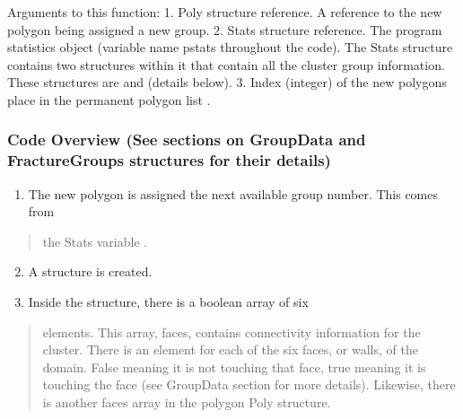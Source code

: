 \documentclass[letterpaper,10pt,english]{sphinxmanual}
\begin{document}
Arguments to this function:
1.      Poly structure reference. A reference to the new
polygon being assigned a new group.
2.      Stats structure reference. The program
statistics object (variable name pstats throughout the code). The Stats
structure contains two structures within it that contain all the cluster group
information. These structures are  and  (details
below).
3.      Index (integer) of the new polygons place in the permanent polygon
list .


\subsubsection{Code Overview (See sections on GroupData and FractureGroups structures for their details)}
\label{dfngen:code-overview-see-sections-on-groupdata-and-fracturegroups-structures-for-their-details}\begin{enumerate}
\item {} 
The new polygon is assigned the next available group number. This comes from

\end{enumerate}
\begin{quote}

the Stats variable .
\end{quote}
\begin{enumerate}
\setcounter{enumi}{1}
\item {} 
A  structure is created.

\item {} 
Inside the  structure, there is a boolean array of six

\end{enumerate}
\begin{quote}

elements. This array, faces, contains connectivity information for the
cluster. There is an element for each of the six faces, or walls, of the
domain. False meaning it is not touching that face, true meaning it is
touching the face (see GroupData section for more details). Likewise, there
is another faces array in the polygon Poly structure.
\end{quote}
\end{document}
